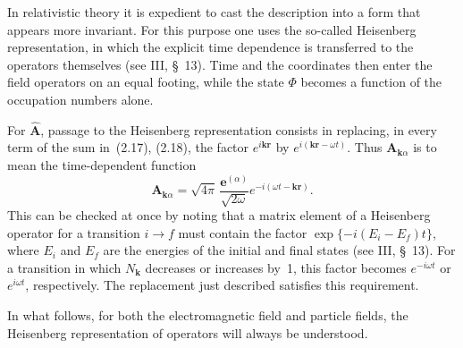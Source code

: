 In relativistic theory it is expedient to cast the description into a form that appears more invariant. For this purpose one uses the so-called Heisenberg representation, in which the explicit time dependence is transferred to the operators themselves (see III, \S~13). Time and the coordinates then enter the field operators on an equal footing, while the state $\Phi$ becomes a function of the occupation numbers alone.

For $\widehat{\mathbf{A}}$, passage to the Heisenberg representation consists in replacing, in every term of the sum in~(2.17), (2.18), the factor $e^{i\mathbf{kr}}$ by $e^{i(\mathbf{kr}-\omega t)}$. Thus $\mathbf{A}_{\mathbf{k}\alpha}$ is to mean the time-dependent function
\begin{equation}
\mathbf{A}_{\mathbf{k}\alpha}=\sqrt{4\pi}\,\frac{\mathbf{e}^{(\alpha)}}{\sqrt{2\omega}}e^{-i(\omega t-\mathbf{kr})}.
\tag{2.26}
\end{equation}
This can be checked at once by noting that a matrix element of a Heisenberg operator for a transition $i\to f$ must contain the factor $\exp\{-i(E_i-E_f)t\}$, where $E_i$ and $E_f$ are the energies of the initial and final states (see III, \S~13). For a transition in which $N_{\mathbf{k}}$ decreases or increases by~1, this factor becomes $e^{-i\omega t}$ or $e^{i\omega t}$, respectively. The replacement just described satisfies this requirement.

In what follows, for both the electromagnetic field and particle fields, the Heisenberg representation of operators will always be understood.
